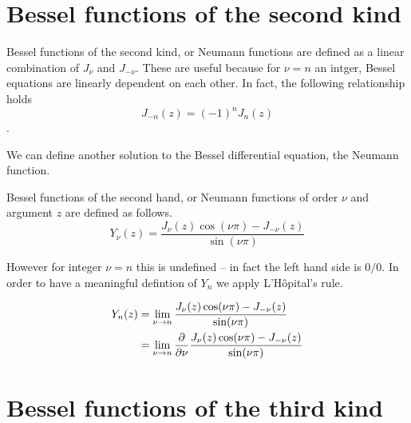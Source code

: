 \section{Bessel functions of the second kind}

Bessel functions of the second kind, or Neumann functions are defined as a linear combination of $J_\nu$ and $J_{-\nu}$. These are useful because for $\nu = n$ an intger, Bessel equations are linearly dependent on each other. In fact, the following relationship holds \cite{korenev02bessel_func}
\[J_{-n}(z) = (-1)^n J_{n}(z)\].

We can define another solution to the Bessel differential equation, the Neumann function.

\begin{defn} Bessel functions of the second hand, or Neumann functions of order $\nu$ and argument $z$ are defined as follows.
  \[Y_\nu(z) = \frac{J_\nu(z) \cos (\nu \pi)- J_{-\nu}(z)}{\sin (\nu \pi)}\]
\end{defn}

However for integer $\nu=n$ this is undefined -- in fact the left hand side is $0/0$. In order to have a meaningful defintion of $Y_n$ we apply L'Hôpital's rule.

\begin{align*}
  Y_n(z) &= \lim_ {\nu \rightarrow n}\frac{J_\nu(z) \cos (\nu \pi)- J_{-\nu}(z)}{\sin (\nu \pi)} \\
      &= \lim_ {\nu \rightarrow n} \frac{\partial }{\partial \nu} \frac{J_\nu(z) \cos (\nu \pi)- J_{-\nu}(z)}{\sin (\nu \pi)}
\end{align*}


\section{Bessel functions of the third kind}

